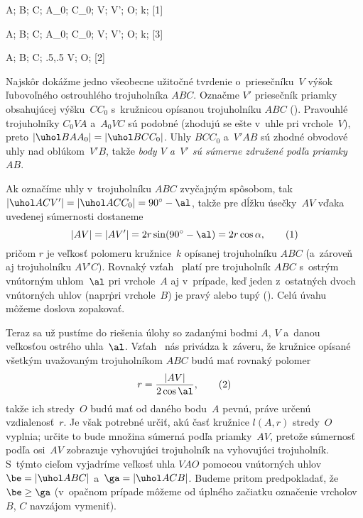 {%
\fontplace
\trpoint A; \tlpoint B; \bpoint C;
\lBpoint A_0; \rtpoint C_0;
\rBpoint V; \tpoint V'; \bpoint O;
\rBpoint k;
[1] \hfil\Obr

\fontplace
\trpoint A; \tlpoint B; \lBpoint C;
\tpoint A_0; \lBpoint C_0;
\lpoint V; \lpoint V'; \bpoint O;
\rBpoint k;
[3] \hfil\Obr

\fontplace
\trpoint A; \tlpoint B; \bpoint C;
\rBpoint\xy.5,.5 V; \lBpoint O;
[2] \hfil\Obr

Najskôr dokážme jedno všeobecne užitočné tvrdenie
o~priesečníku~$V$ výšok %
ľubovoľného ostrouhlého trojuholníka $ABC$.
Označme $V'$ priesečník priamky obsahujúcej výšku~$CC_0$ s~kružnicou
opísanou trojuholníku $ABC$ (\obr).
\inspicture{}
Pravouhlé trojuholníky $C_0V\!A$ a~$A_0VC$ sú podobné (zhodujú se ešte
v~uhle pri vrchole~$V$), preto $|\uhol BAA_0|=|\uhol BCC_0|$.
Uhly $BCC_0$ a~$V'\!AB$ sú zhodné obvodové uhly nad oblúkom~$V'\!B$,
takže {\it body $V$ a~$V'$ sú súmerne združené podľa priamky~$AB$}.

Ak označíme uhly v~trojuholníku $ABC$ zvyčajným spôsobom, tak $|\uhol ACV'|=
|\uhol ACC_0|=90^{\circ}-\al$, takže pre dĺžku úsečky~$AV$
vďaka uvedenej súmernosti
dostaneme
$$
|AV|=|AV'|=2r\sin(90^{\circ}-\al)=2r\cos\alpha,     \tag1
$$
pričom $r$ je veľkosť polomeru kružnice~$k$ opísanej trojuholníku $ABC$ (a~zároveň
aj trojuholníku $AV'C$).
Rovnaký vzťah~ platí pre trojuholník $ABC$ s~ostrým vnútorným uhlom~$\al$
pri vrchole~$A$ aj v~prípade,
keď jeden z~ostatných dvoch vnútorných uhlov (napr\. pri vrchole~$B$)
je pravý alebo tupý (\obr). Celú úvahu môžeme doslova zopakovať.
\inspicture{}

Teraz sa už pustíme do riešenia úlohy
so zadanými bodmi $A$, $V$ a~danou veľkosťou ostrého uhla~$\al$.
Vzťah~ nás privádza k~záveru, že
kružnice opísané všetkým uvažovaným trojuholníkom $ABC$
budú mať rovnaký polomer
$$
r=\frac{|AV|}{2\cos\al},    \tag2
$$
takže ich stredy~$O$ budú mať od daného bodu~$A$ pevnú, práve
určenú vzdialenosť~$r$. Je však potrebné určiť,
akú časť kružnice
$l(A,r)$ stredy~$O$ vyplnia; určite to bude množina súmerná podľa
priamky~$AV$, pretože súmernosť podľa osi~$AV$ zobrazuje vyhovujúci trojuholník
na vyhovujúci trojuholník.
S~týmto cieľom vyjadríme veľkosť uhla $V\!AO$ pomocou
vnútorných uhlov $\be=|\uhol ABC|$ a~$\ga=|\uhol ACB|$.
Budeme pritom predpokladať,
že $\be\ge\ga$
(v~opačnom prípade môžeme od úplného začiatku označenie
vrcholov $B$, $C$ navzájom vymeniť).

}
